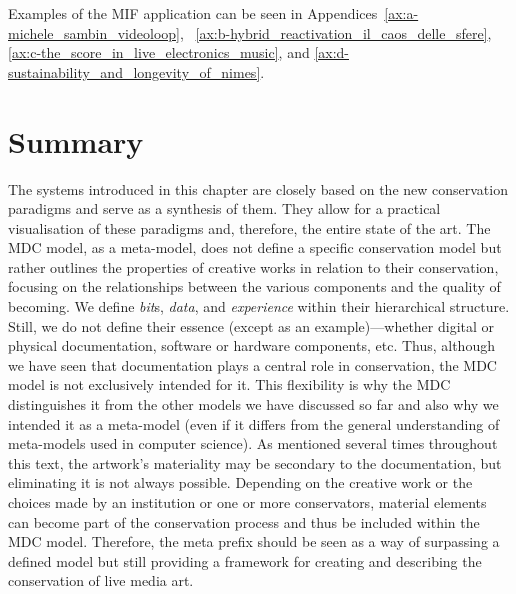 Examples of the MIF application can be seen in Appendices~\ref{ax:a-michele_sambin_videoloop}, ~\ref{ax:b-hybrid_reactivation_il_caos_delle_sfere}, \ref{ax:c-the_score_in_live_electronics_music}, and \ref{ax:d-sustainability_and_longevity_of_nimes}.  


\section{Summary}
The systems introduced in this chapter are closely based on the new conservation paradigms and serve as a synthesis of them. They allow for a practical visualisation of these paradigms and, therefore, the entire state of the art.
The MDC model, as a meta-model, does not define a specific conservation model but rather outlines the properties of creative works in relation to their conservation, focusing on the relationships between the various components and the quality of becoming. We define \textit{bit}s, \textit{data}, and \textit{experience} within their hierarchical structure. Still, we do not define their essence (except as an example)—whether digital or physical documentation, software or hardware components, etc. Thus, although we have seen that documentation plays a central role in conservation, the MDC model is not exclusively intended for it. This flexibility is why the MDC distinguishes it from the other models we have discussed so far and also why we intended it as a meta-model (even if it differs from the general understanding of meta-models used in computer science). As mentioned several times throughout this text, the artwork's materiality may be secondary to the documentation, but eliminating it is not always possible. Depending on the creative work or the choices made by an institution or one or more conservators, material elements can become part of the conservation process and thus be included within the MDC model. Therefore, the meta prefix should be seen as a way of surpassing a defined model but still providing a framework for creating and describing the conservation of live media art.\\
